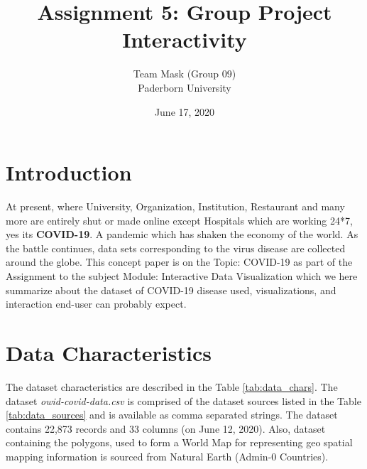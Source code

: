 \documentclass[10pt]{article}
\newcommand{\participant}{Team Mask (Group 09)}
\newcommand{\affiliation}{Paderborn University}
\newcommand{\topic}{Assignment 5: Group Project Interactivity}
\newcommand{\submissiondate}{June 17, 2020}
\begin{document}
\title{\topic}
\author{\Large{\participant}\\ \affiliation \\}
\date{\submissiondate}
\maketitle
\thispagestyle{empty}




\section{Introduction}

\color{black}
At present, where University, Organization, Institution, Restaurant and many more are entirely shut or made online except Hospitals which are working 24*7, yes its {\bf COVID-19}. A pandemic which has shaken the economy of the world. As the battle continues, data sets corresponding to the virus disease are collected around the globe. This concept paper is on the Topic: COVID-19 as part of the Assignment to the subject Module: Interactive Data Visualization which we here summarize about the dataset of COVID-19 disease used, visualizations, and interaction end-user can probably expect.

\section{Data Characteristics}

The dataset characteristics are described in the Table \ref{tab:data_chars}. The dataset \textit{owid-covid-data.csv} is comprised of the dataset sources listed in the Table \ref{tab:data_sources} and is available as comma separated strings. The dataset contains 22,873 records and 33 columns (on June 12, 2020). Also, dataset containing the polygons, used to form a World Map for representing geo spatial mapping information is sourced from Natural Earth (Admin-0 Countries). 

\end{document}
